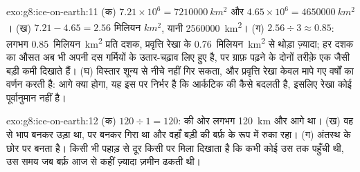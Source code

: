 \begin{solution}{exo:g8:ice-on-earth:11}
(क) $7.21 \times 10^6 = \qty{7210000}{km^2}$ और $4.65 \times 10^6 =
\qty{4650000}{km^2}$।
(ख) $7.21 - 4.65 = \num{2.56}\text{ मिलियन }\unit{km^2}$, यानी \qty{2560000}{km^2}।
(ग) $2.56 \div 3 \approx 0.85$: लगभग \num{0.85}~मिलियन~\unit{km^2} प्रति दशक,
प्रवृत्ति रेखा के \num{0.76}~मिलियन~\unit{km^2} से थोड़ा ज़्यादा; हर दशक का औसत अब भी
अपनी दस गर्मियों के उतार-चढ़ाव लिए हुए है, पर ग्राफ़ पढ़ने के दोनों तरीक़े एक जैसी बड़ी
कमी दिखाते हैं। (घ) विस्तार शून्य से नीचे नहीं गिर सकता, और प्रवृत्ति रेखा केवल मापे गए
वर्षों का वर्णन करती है: आगे क्या होगा, यह इस पर निर्भर है कि आर्कटिक की  कैसे
बदलती है, इसलिए रेखा कोई पूर्वानुमान नहीं है।
\end{solution}

\begin{solution}{exo:g8:ice-on-earth:12}
(क) $120 \div 1 = 120$:   की ओर लगभग \qty{120}{km} और आगे था। (ख) वह
 से भाप बनकर उड़ा था,  पर  बनकर गिरा था और वहाँ बड़ी  की
बर्फ़ के रूप में रुका रहा। (ग) अंतस्थ   के छोर पर बनता है। किसी भी पहाड़ से दूर
किसी  पर मिला  दिखाता है कि कभी कोई  उस  तक पहुँची थी, उस समय
जब बर्फ़ आज से कहीं ज़्यादा ज़मीन ढकती थी।
\end{solution}

